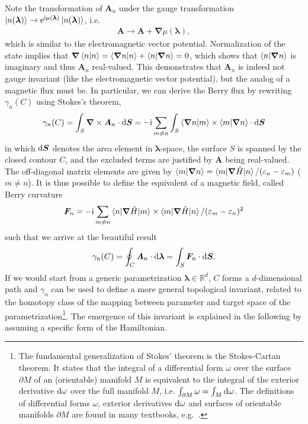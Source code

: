 Note the transformation of $\bm A_n$ under the gauge transformation $\ket{n(\bm \lambda)}\rightarrow\mathrm e^{\mathrm i\mu(\bm \lambda)}\ket{n(\bm \lambda)}$, i.e.
\begin{align}
    \bm A \rightarrow {\bm A} + \bm\nabla\mu(\bm \lambda),
\end{align}
which is similar to the electromagnetic vector potential.
Normalization of the state implies that $\bm\nabla \braket{n|n} = \braket{\bm\nabla n|n} + \braket{n|\bm\nabla n} = 0$, which shows that $\braket{n|\bm\nabla n}$ is imaginary and thus ${\bm A_n}$ real-valued.
This demonstrates that $\bm A_n$ is indeed not gauge invariant (like the electromagnetic vector potential), but the analog of a magnetic flux must be.
In particular, we can derive the Berry flux by rewriting $\gamma_n(C)$ using Stokes's theorem,
\begin{align}
    \gamma_n(C) = \int_S{\bm\nabla}\times{\bm A_n}\cdot\mathrm d{\bm S} = -\mathrm i\sum_{m\neq n}\int_S\braket{\bm\nabla n|m}\times\braket{m|\bm\nabla n}\cdot \mathrm d{\bm S}
    \label{eq:berry_phase_stokes_theorem}
\end{align}
in which $\mathrm d{\bm S}$ denotes the area element in ${\bm \lambda}$-space, the surface $S$ is spanned by the closed contour $C$, and the excluded terms are justified by $\bm A$ being real-valued.
The off-diagonal matrix elements are given by $\braket{m|{\bm\nabla} n} = \braket{m|\bm\nabla\hat H|n}/(\varepsilon_n-\varepsilon_m)$ ($m\neq n$).
It is thus possible to define the equivalent of a magnetic field, called Berry curvature
\begin{align}
    \bm F_n = -\mathrm i\sum_{m\neq n}\braket{n|\bm\nabla\hat H|m}\times\braket{m|\bm\nabla\hat H|n}/(\varepsilon_m-\varepsilon_n)^2
\end{align}
such that we arrive at the beautiful result
\begin{align}
    \gamma_n(C) = \oint_C{\bm A_n}\cdot\mathrm d \bm \lambda = \int_S {\bm F_n}\cdot\mathrm d{\bm S}.
    \label{eq:berry_phase_stokes_theorem_2}
\end{align}
If we would start from a generic parametrization $\bm\lambda\in\mathds R^d$, $C$ forms a $d$-dimensional path and $\gamma_n$ can be used to define a more general topological invariant, related to the homotopy class of the mapping between parameter and target space of the parametrization\footnote{
    The fundamental generalization of Stokes' theorem is the Stokes-Cartan theorem.
    It states that the integral of a differential form $\omega$ over the surface $\partial M$ of an (orientable) manifold $M$ is equivalent to the integral of the exterior derivative $\mathrm d\omega$ over the full manifold $M$, i.e. $\int_{\partial M}\omega = \int_M\mathrm d\omega$.
    The definitions of differential forms $\omega$, exterior derivatives $\mathrm d\omega$ and surfaces of orientable manifolds $\partial M$ are found in many textbooks, e.g.~\cite{Nakahara1990}.
}.
The emergence of this invariant is explained in the following by assuming a specific form of the Hamiltonian.

